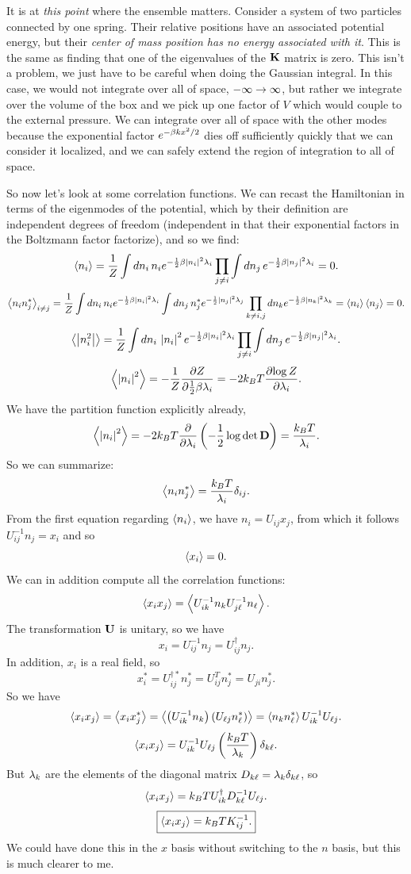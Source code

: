 \documentclass[12pt]{article}
\begin{document}
It is at \emph{this point} where the ensemble matters. Consider a system of two particles connected by one spring. Their relative positions have an associated potential energy, but their \emph{center of mass position has no energy associated with it}. This is the same as finding that one of the eigenvalues of the $\mathbf{K}$ matrix is zero. This isn't a problem, we just have to be careful when doing the Gaussian integral. In this case, we would not integrate over all of space, $-\infty \rightarrow \infty$, but rather we integrate over the volume of the box and we pick up one factor of $V$ which would couple to the external pressure. We can integrate over all of space with the other modes because the exponential factor $e^{-\beta k x^2/2}$ dies off sufficiently quickly that we can consider it localized, and we can safely extend the region of integration to all of space.

So now let's look at some correlation functions. We can recast the Hamiltonian in terms of the eigenmodes of the potential, which by their definition are independent degrees of freedom (independent in that their exponential factors in the Boltzmann factor factorize), and so we find:
\[ \left \langle n_i \right \rangle = \frac{1}{Z} \int dn_i \, n_i e^{-\frac{1}{2} \beta \left | n_i \right |^2 \lambda_i} \prod_{j\neq i} \int dn_j \, e^{-\frac{1}{2}\beta \left | n_j \right |^2 \lambda_i} = 0.\]
\[ \left \langle n_i n_j^* \right \rangle_{i\neq j} = \frac{1}{Z} \int dn_i \, n_i e^{-\frac{1}{2} \beta \left | n_i \right |^2 \lambda_i} \int dn_j \, n_j^* e^{-\frac{1}{2} \left | n_j \right |^2 \lambda _ j} \prod_{k \neq i,j} dn_k e^{-\frac{1}{2} \beta \left | n_k \right |^2 \lambda_k} = \left \langle n_i \right \rangle\left \langle n_j \right \rangle = 0.\]
\[ \left \langle \left | n_i^2 \right | \right \rangle = \frac{1}{Z} \int dn_i \, \left | n_i \right |^2 e^{-\frac{1}{2} \beta \left | n_i \right |^2 \lambda_i} \prod_{j\neq i} \int dn_j \, e^{-\frac{1}{2}\beta \left | n_j \right |^2 \lambda_i}.\]
\[ \left \langle \left | n_i \right |^2 \right \rangle = -\frac{1}{Z} \frac{\partial {Z}}{\partial {\frac{1}{2} \beta\lambda_i}} = -2k_BT \frac{\partial {\log Z}}{\partial {\lambda_i}}.\]
We have the partition function explicitly already,
\[ \left \langle \left | n_i \right |^2 \right \rangle = -2k_BT \frac{\partial {}}{\partial {\lambda_i}} \left( -\frac{1}{2} \log \det \mathbf{D}\right) = \frac{k_BT}{\lambda_i}.\]
So we can summarize:
\[ \left \langle n_in_j^* \right \rangle = \frac{k_BT}{\lambda_i}\delta_{ij}.\]
From the first equation regarding $\left \langle n_i \right \rangle$, we have $n_i = U_{ij} x_j$, from which it follows $U^{-1}_{ij} n_j = x_i$ and so
\[ \left \langle x_i \right \rangle = 0.\]
We can in addition compute all the correlation functions:
\[ \left \langle x_i x_j \right \rangle = \left \langle U^{-1}_{ik}n_k U^{-1}_{j\ell}n_\ell \right \rangle.\]
The transformation $\mathbf{U}$ is unitary, so we have
\[ x_i = U^{-1}_{ij}n_j = U^\dagger_{ij} n_j.\]
In addition, $x_i$ is a real field, so
\[ x_i^* = U^{\dagger *}_{ij} n_j^* = U^{T}_{ij}n_j^* = U_{ji}n_j^*.\]
So we have
\[ \left \langle x_i x_j \right \rangle = \left \langle x_i x_j^* \right \rangle = \left \langle \left(U^{-1}_{ik} n_k\right)\left(U_{\ell j}n^*_\ell\right) \right \rangle = \left \langle n_k n_\ell^* \right \rangle  U^{-1}_{i k} U_{\ell j}.\]
\[ \left \langle x_i x_j \right \rangle =  U^{-1}_{ik} U_{\ell j}  \left(\frac{k_BT}{\lambda_k}\right)\delta_{k\ell}.\]
But $\lambda_k$ are the elements of the diagonal matrix $D_{k\ell} = \lambda_k \delta_{k\ell}$, so
\[ \left \langle x_i x_j \right \rangle = k_BT U^\dagger_{ik} D^{-1}_{k\ell} U_{\ell j}.\]
\[ \boxed{\left \langle x_i x_j \right \rangle = k_BT K^{-1}_{ij}.}\]
We could have done this in the $x$ basis without switching to the $n$ basis, but this is much clearer to me.
\end{document}
